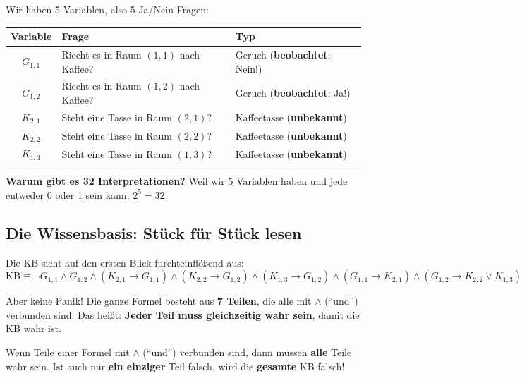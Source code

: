 \documentclass[a4paper,12pt]{article}
\begin{document}
Wir haben 5 Variablen, also 5 Ja/Nein-Fragen:

\begin{center}
\renewcommand{\arraystretch}{1.4}
\begin{tabular}{c|l|l}
\toprule
\textbf{Variable} & \textbf{Frage} & \textbf{Typ} \\
\midrule
$G_{1,1}$ & Riecht es in Raum $(1{,}1)$ nach Kaffee? & Geruch (\textbf{beobachtet}: Nein!) \\
$G_{1,2}$ & Riecht es in Raum $(1{,}2)$ nach Kaffee? & Geruch (\textbf{beobachtet}: Ja!) \\
$K_{2,1}$ & Steht eine Tasse in Raum $(2{,}1)$? & Kaffeetasse (\textbf{unbekannt}) \\
$K_{2,2}$ & Steht eine Tasse in Raum $(2{,}2)$? & Kaffeetasse (\textbf{unbekannt}) \\
$K_{1,3}$ & Steht eine Tasse in Raum $(1{,}3)$? & Kaffeetasse (\textbf{unbekannt}) \\
\bottomrule
\end{tabular}
\end{center}

\textbf{Warum gibt es 32 Interpretationen?} Weil wir 5 Variablen haben und jede entweder 0 oder 1 sein kann: $2^5 = 32$.


\subsection{Die Wissensbasis: St\"uck f\"ur St\"uck lesen}

Die KB sieht auf den ersten Blick furchteinfl\"o\ss end aus:
\[
\text{KB} \equiv \neg G_{1,1} \wedge G_{1,2} \wedge (K_{2,1} \to G_{1,1}) \wedge (K_{2,2} \to G_{1,2}) \wedge (K_{1,3} \to G_{1,2}) \wedge (G_{1,1} \to K_{2,1}) \wedge (G_{1,2} \to K_{2,2} \vee K_{1,3})
\]

Aber keine Panik! Die ganze Formel besteht aus \textbf{7 Teilen}, die alle mit $\wedge$ ("`und"') verbunden sind. Das hei\ss t: \textbf{Jeder Teil muss gleichzeitig wahr sein}, damit die KB wahr ist.

\begin{merkbox}
Wenn Teile einer Formel mit $\wedge$ ("`und"') verbunden sind, dann m\"ussen \textbf{alle} Teile wahr sein. Ist auch nur \textbf{ein einziger} Teil falsch, wird die \textbf{gesamte} KB falsch!
\end{merkbox}
\end{document}
